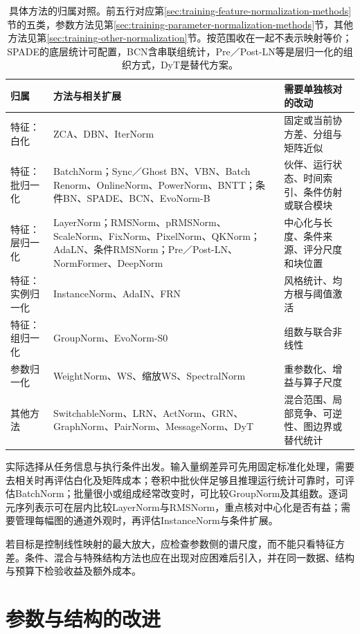\begin{table}[htbp]
  \centering\small
  \begin{tabularx}{\linewidth}{@{}p{26mm}p{85mm}X@{}}
    \toprule
    归属 & 方法与相关扩展 & 需要单独核对的改动 \\
    \midrule
    特征：白化 & ZCA、DBN、IterNorm & 固定或当前协方差、分组与矩阵近似 \\
    特征：批归一化 & BatchNorm；Sync／Ghost BN、VBN、Batch Renorm、OnlineNorm、PowerNorm、BNTT；条件BN、SPADE、BCN、EvoNorm-B & 伙伴、运行状态、时间索引、条件仿射或联合模块 \\
    特征：层归一化 & LayerNorm；RMSNorm、pRMSNorm、ScaleNorm、FixNorm、PixelNorm、QKNorm；AdaLN、条件RMSNorm；Pre／Post-LN、NormFormer、DeepNorm & 中心化与长度、条件来源、评分尺度和块位置 \\
    特征：实例归一化 & InstanceNorm、AdaIN、FRN & 风格统计、均方根与阈值激活 \\
    特征：组归一化 & GroupNorm、EvoNorm-S0 & 组数与联合非线性 \\
    参数归一化 & WeightNorm、WS、缩放WS、SpectralNorm & 重参数化、增益与算子尺度 \\
    其他方法 & SwitchableNorm、LRN、ActNorm、GRN、GraphNorm、PairNorm、MessageNorm、DyT & 混合范围、局部竞争、可逆性、图边界或替代统计 \\
    \bottomrule
  \end{tabularx}
  \caption{具体方法的归属对照。前五行对应第\ref{sec:training-feature-normalization-methods}节的五类，参数方法见第\ref{sec:training-parameter-normalization-methods}节，其他方法见第\ref{sec:training-other-normalization}节。按范围收在一起不表示映射等价；SPADE的底层统计可配置，BCN含串联组统计，Pre／Post-LN等是层归一化的组织方式，DyT是替代方案。}
  \label{tab:training-normalization-extended-comparison}
\end{table}
\FloatBarrier

实际选择从任务信息与执行条件出发。输入量纲差异可先用固定标准化处理，需要去相关时再评估白化及矩阵成本；卷积中批伙伴足够且推理运行统计可靠时，可评估BatchNorm；批量很小或组成经常改变时，可比较GroupNorm及其组数。逐词元序列表示可在层内比较LayerNorm与RMSNorm，重点核对中心化是否有益；需要管理每幅图的通道外观时，再评估InstanceNorm与条件扩展。

若目标是控制线性映射的最大放大，应检查参数侧的谱尺度，而不能只看特征方差。条件、混合与特殊结构方法也应在出现对应困难后引入，并在同一数据、结构与预算下检验收益及额外成本。

\section{参数与结构的改进}
\label{sec:training-connections}


